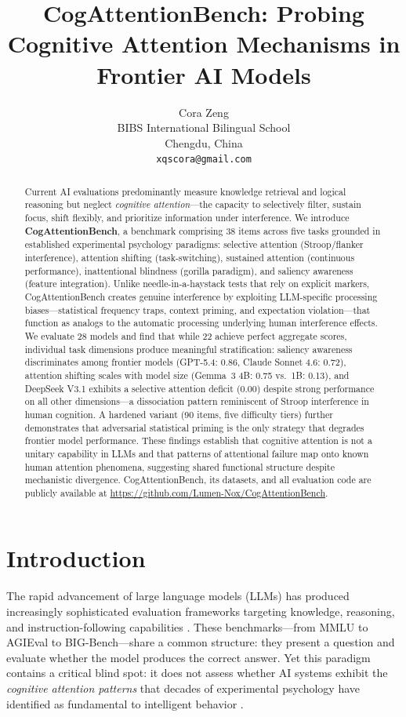 \documentclass{article}
\title{CogAttentionBench: Probing Cognitive Attention Mechanisms in Frontier AI Models}
\author{%
  Cora Zeng \\
  BIBS International Bilingual School \\
  Chengdu, China \\
  \texttt{xqscora@gmail.com} \\
}
\begin{document}
\maketitle

\begin{abstract}
Current AI evaluations predominantly measure knowledge retrieval and logical reasoning but neglect \emph{cognitive attention}---the capacity to selectively filter, sustain focus, shift flexibly, and prioritize information under interference. We introduce \textbf{CogAttentionBench}, a benchmark comprising 38 items across five tasks grounded in established experimental psychology paradigms: selective attention (Stroop/flanker interference), attention shifting (task-switching), sustained attention (continuous performance), inattentional blindness (gorilla paradigm), and saliency awareness (feature integration). Unlike needle-in-a-haystack tests that rely on explicit markers, CogAttentionBench creates genuine interference by exploiting LLM-specific processing biases---statistical frequency traps, context priming, and expectation violation---that function as analogs to the automatic processing underlying human interference effects. We evaluate 28 models and find that while 22 achieve perfect aggregate scores, individual task dimensions produce meaningful stratification: saliency awareness discriminates among frontier models (GPT-5.4: 0.86, Claude Sonnet 4.6: 0.72), attention shifting scales with model size (Gemma~3 4B: 0.75 vs.\ 1B: 0.13), and DeepSeek V3.1 exhibits a selective attention deficit (0.00) despite strong performance on all other dimensions---a dissociation pattern reminiscent of Stroop interference in human cognition. A hardened variant (90 items, five difficulty tiers) further demonstrates that adversarial statistical priming is the only strategy that degrades frontier model performance. These findings establish that cognitive attention is not a unitary capability in LLMs and that patterns of attentional failure map onto known human attention phenomena, suggesting shared functional structure despite mechanistic divergence. CogAttentionBench, its datasets, and all evaluation code are publicly available at \url{https://github.com/Lumen-Nox/CogAttentionBench}.
\end{abstract}

\section{Introduction}

The rapid advancement of large language models (LLMs) has produced increasingly sophisticated evaluation frameworks targeting knowledge, reasoning, and instruction-following capabilities \citep{hendrycks2021,zhong2024,srivastava2023}. These benchmarks---from MMLU to AGIEval to BIG-Bench---share a common structure: they present a question and evaluate whether the model produces the correct answer. Yet this paradigm contains a critical blind spot: it does not assess whether AI systems exhibit the \emph{cognitive attention patterns} that decades of experimental psychology have identified as fundamental to intelligent behavior \citep{posner1980,broadbent1958,kahneman1973}.
\end{document}
